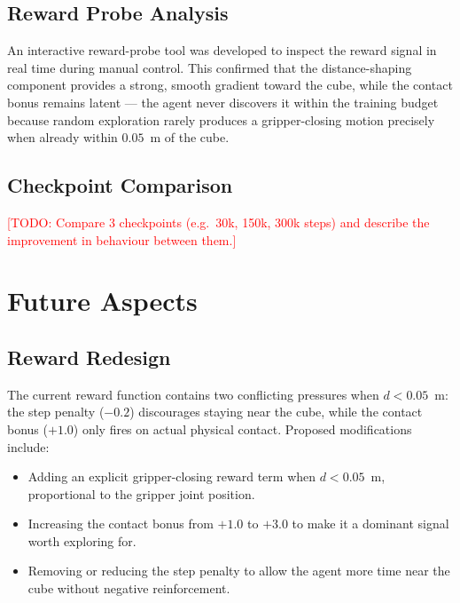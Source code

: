 \documentclass[conference]{IEEEtran}
\newcommand{\todo}[1]{\textcolor{red}{[TODO: #1]}}  %
\begin{document}
\subsection{Reward Probe Analysis}

An interactive reward-probe tool was developed to inspect the
reward signal in real time during manual control.
This confirmed that the distance-shaping component provides a
strong, smooth gradient toward the cube, while the contact bonus
remains latent — the agent never discovers it within the training
budget because random exploration rarely produces a gripper-closing
motion precisely when already within $0.05$~m of the cube.

\subsection{Checkpoint Comparison}

\todo{Compare 3 checkpoints (e.g.\ 30k, 150k, 300k steps) and
describe the improvement in behaviour between them.}


\section{Future Aspects}
\label{sec:future}

\subsection{Reward Redesign}

The current reward function contains two conflicting pressures
when $d < 0.05$~m: the step penalty ($-0.2$) discourages staying
near the cube, while the contact bonus ($+1.0$) only fires on
actual physical contact.
Proposed modifications include:
\begin{itemize}
    \item Adding an explicit gripper-closing reward term when
          $d < 0.05$~m, proportional to the gripper joint position.
    \item Increasing the contact bonus from $+1.0$ to $+3.0$ to
          make it a dominant signal worth exploring for.
    \item Removing or reducing the step penalty to allow the agent
          more time near the cube without negative reinforcement.
\end{itemize}
\end{document}
